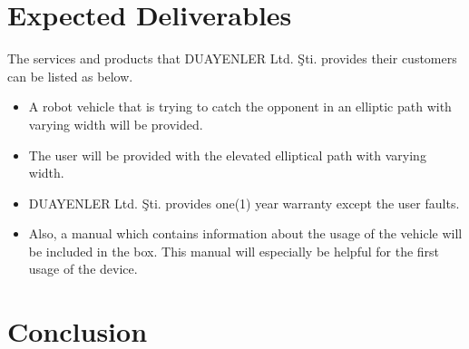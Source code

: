 \documentclass[a4paper,12pt]{article}
\begin{document}
\section{Expected Deliverables}

The services and products that DUAYENLER Ltd. Şti. provides their customers can be listed as below.
\begin{itemize}
	\item A robot vehicle that is trying to catch the opponent in an elliptic path with varying width will be provided.
	\item The user will be provided with the elevated elliptical path with varying width.
	\item DUAYENLER Ltd. Şti. provides one(1) year warranty except the user faults.
	\item Also, a manual  which contains information about the usage of the vehicle will be included in the box. This manual will especially be helpful for the first usage of the device.
\end{itemize} 


\section{Conclusion}

\newpage
\begin{appendices}
	
		
		

	
\end{appendices}
\end{document}
